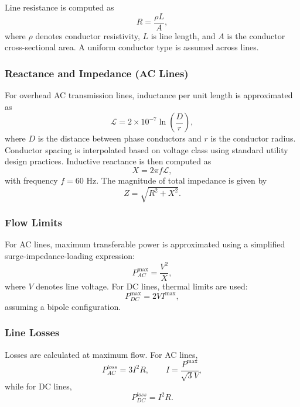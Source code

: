 \documentclass[12pt]{article}
\begin{document}
Line resistance is computed as
\begin{equation}
R = \frac{\rho L}{A},
\end{equation}
where $\rho$ denotes conductor resistivity, $L$ is line length, and $A$ is the conductor cross-sectional area. A uniform conductor type is assumed across lines.

\subsubsection{Reactance and Impedance (AC Lines)}

For overhead AC transmission lines, inductance per unit length is approximated as
\begin{equation}
\mathcal{L} = 2 \times 10^{-7} \ln\left(\frac{D}{r}\right),
\end{equation}
where $D$ is the distance between phase conductors and $r$ is the conductor radius. Conductor spacing is interpolated based on voltage class using standard utility design practices. Inductive reactance is then computed as
\begin{equation}
X = 2 \pi f \mathcal{L},
\end{equation}
with frequency $f = 60$ Hz. The magnitude of total impedance is given by
\begin{equation}
Z = \sqrt{R^2 + X^2}.
\end{equation}

\subsubsection{Flow Limits}

For AC lines, maximum transferable power is approximated using a simplified surge-impedance-loading expression:
\begin{equation}
P^{\max}_{AC} = \frac{V^2}{X},
\end{equation}
where $V$ denotes line voltage. For DC lines, thermal limits are used:
\begin{equation}
P^{\max}_{DC} = 2 V I^{\max},
\end{equation}
assuming a bipole configuration.

\subsubsection{Line Losses}

Losses are calculated at maximum flow. For AC lines,
\begin{equation}
P^{loss}_{AC} = 3 I^2 R,
\qquad
I = \frac{P^{\max}}{\sqrt{3} V},
\end{equation}
while for DC lines,
\begin{equation}
P^{loss}_{DC} = I^2 R.
\end{equation}
\end{document}
